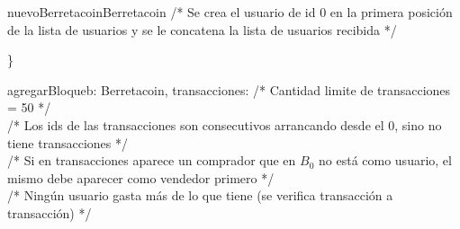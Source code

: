 \documentclass[10pt,a4paper]{article}
\begin{document}
\begin{tcolorbox}
        \begin{proc}{nuevoBerretacoin}{}{Berretacoin}
            \textcolor{babyblue}{/* Se crea el usuario de id 0 en la primera posición de la lista de usuarios y se le concatena la lista de usuarios recibida */} \\
        \end{proc} \}
        \vspace{0.3em}
        \begin{proc}{agregarBloque}{\Inout b: Berretacoin, \In transacciones: }{}
            \textcolor{babyblue}{/* Cantidad limite de transacciones = 50 */} \\
            \textcolor{babyblue}{/* Los ids de las transacciones son consecutivos arrancando desde el 0, sino no tiene transacciones */} \\
            \textcolor{babyblue}{/* Si en transacciones aparece un comprador que en $B_0$ no está como usuario, el mismo debe aparecer como vendedor primero */} \\
            \textcolor{babyblue}{/* Ningún usuario gasta más de lo que tiene (se verifica transacción a transacción) */} \\

\end{proc}
\end{tcolorbox}
\end{document}
